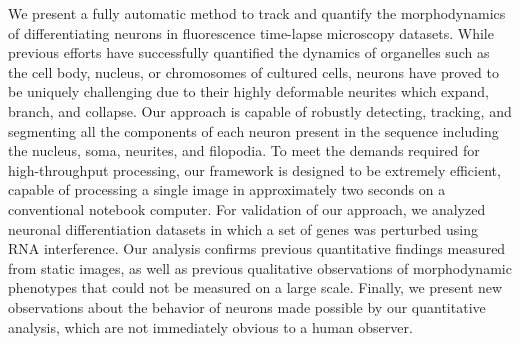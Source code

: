 
We  present  a  fully  automatic  method to  track  and  quantify  the
morphodynamics of  differentiating neurons in  fluorescence time-lapse
microscopy  datasets.    While  previous  efforts   have  successfully
quantified the dynamics of organelles  such as the cell body, nucleus,
or chromosomes of  cultured cells, neurons have proved  to be uniquely
challenging  due to  their  highly deformable  neurites which  expand,
branch, and collapse.  Our  approach is capable of robustly detecting,
tracking, and segmenting all the  components of each neuron present in
the sequence including the nucleus, soma, neurites, and filopodia.  To
meet  the   demands  required  for   high-throughput  processing,  our
framework is designed to be extremely efficient, capable of processing
a single image in approximately two seconds on a conventional notebook
computer.   For  validation  of  our approach,  we  analyzed  neuronal
differentiation datasets in  which a set of genes  was perturbed using
RNA interference. Our analysis confirms previous quantitative findings
measured  from   static  images,  as  well   as  previous  qualitative
observations of  morphodynamic phenotypes that could  not be measured
on a large scale. Finally,  we present new observations about the 
behavior of  neurons made  possible by our quantitative  analysis, which
are not immediately obvious to a human observer.











